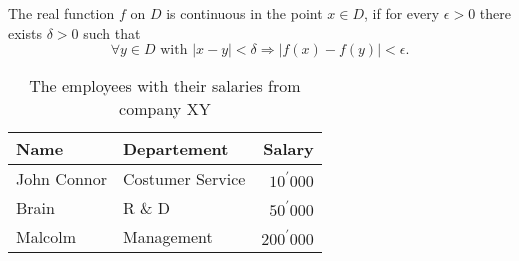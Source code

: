 \documentclass{book}
\begin{document}
    The real function $f$ on $D$ is continuous in the point $x \in D$, if for every $\epsilon>0$ there exists $\delta>0$ such that
    $$
    \forall y \in D \text { with }|x-y|<\delta \Longrightarrow|f(x)-f(y)|<\epsilon .
    $$


    \begin{table}[ht]
        \centering

        \begin{tabular}{l|l|r} 
            Name & Departement & Salary \\
            \hline 
            John Connor & Costumer Service & $10^{\prime} 000$ \\
            Brain & R \& D & $50^{\prime} 000$ \\
            Malcolm & Management & $200^{\prime} 000$
        \end{tabular}
        \label{tab-employees}
        \caption{The employees with their salaries from company XY}
    \end{table}

    
\end{document}
